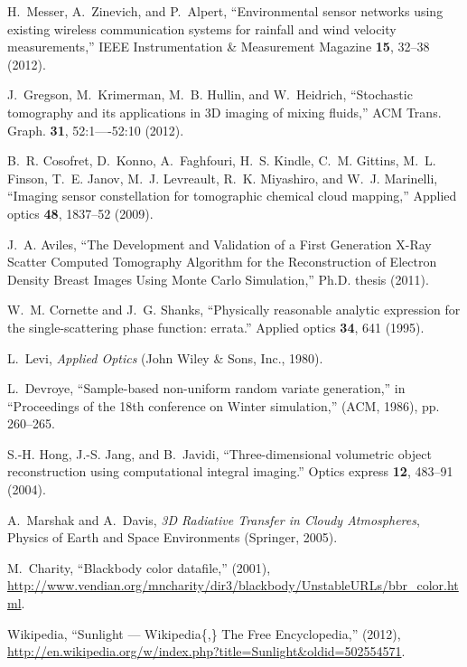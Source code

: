 \documentclass[10pt,letterpaper]{article}
\begin{document}
\begin{thebibliography}{10}
H.~Messer, A.~Zinevich, and P.~Alpert, \enquote{{Environmental sensor networks
  using existing wireless communication systems for rainfall and wind velocity
  measurements},} IEEE Instrumentation \& Measurement Magazine \textbf{15},
  32--38 (2012).

J.~Gregson, M.~Krimerman, M.~B. Hullin, and W.~Heidrich, \enquote{{Stochastic
  tomography and its applications in 3D imaging of mixing fluids},} ACM Trans.
  Graph. \textbf{31}, 52:1----52:10 (2012).

B.~R. Cosofret, D.~Konno, A.~Faghfouri, H.~S. Kindle, C.~M. Gittins, M.~L.
  Finson, T.~E. Janov, M.~J. Levreault, R.~K. Miyashiro, and W.~J. Marinelli,
  \enquote{{Imaging sensor constellation for tomographic chemical cloud
  mapping},} Applied optics \textbf{48}, 1837--52 (2009).

J.~A. Aviles, \enquote{{The Development and Validation of a First Generation
  X-Ray Scatter Computed Tomography Algorithm for the Reconstruction of
  Electron Density Breast Images Using Monte Carlo Simulation},} Ph.D. thesis
  (2011).

W.~M. Cornette and J.~G. Shanks, \enquote{{Physically reasonable analytic
  expression for the single-scattering phase function: errata.}} Applied optics
  \textbf{34}, 641 (1995).

L.~Levi, \emph{{Applied Optics}} (John Wiley \& Sons, Inc., 1980).

L.~Devroye, \enquote{{Sample-based non-uniform random variate generation},} in
  \enquote{Proceedings of the 18th conference on Winter simulation,}  (ACM,
  1986), pp. 260--265.

S.-H. Hong, J.-S. Jang, and B.~Javidi, \enquote{{Three-dimensional volumetric
  object reconstruction using computational integral imaging.}} Optics express
  \textbf{12}, 483--91 (2004).

A.~Marshak and A.~Davis, \emph{{3D Radiative Transfer in Cloudy Atmospheres}},
  Physics of Earth and Space Environments (Springer, 2005).

M.~Charity, \enquote{{Blackbody color datafile},}  (2001), \url{http://www.vendian.org/mncharity/dir3/blackbody/UnstableURLs/bbr\_color.html}.

Wikipedia, \enquote{{Sunlight --- Wikipedia\{,\} The Free Encyclopedia},}  (2012), \url{http://en.wikipedia.org/w/index.php?title=Sunlight\&oldid=502554571}.


\end{thebibliography}
\end{document}
